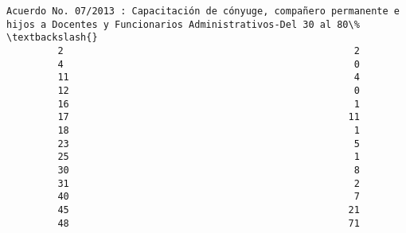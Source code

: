 \documentclass[11pt]{article}
\begin{document}
\begin{Verbatim}[commandchars=\\\{\}]
             Acuerdo No. 07/2013 : Capacitación de cónyuge, compañero permanente e hijos a Docentes y Funcionarios Administrativos-Del 30 al 80\%   \textbackslash{}
         2                                                   2                                                                                      
         4                                                   0                                                                                      
         11                                                  4                                                                                      
         12                                                  0                                                                                      
         16                                                  1                                                                                      
         17                                                 11                                                                                      
         18                                                  1                                                                                      
         23                                                  5                                                                                      
         25                                                  1                                                                                      
         30                                                  8                                                                                      
         31                                                  2                                                                                      
         40                                                  7                                                                                      
         45                                                 21                                                                                      
         48                                                 71                                                                                      
         

\end{Verbatim}
\end{document}
